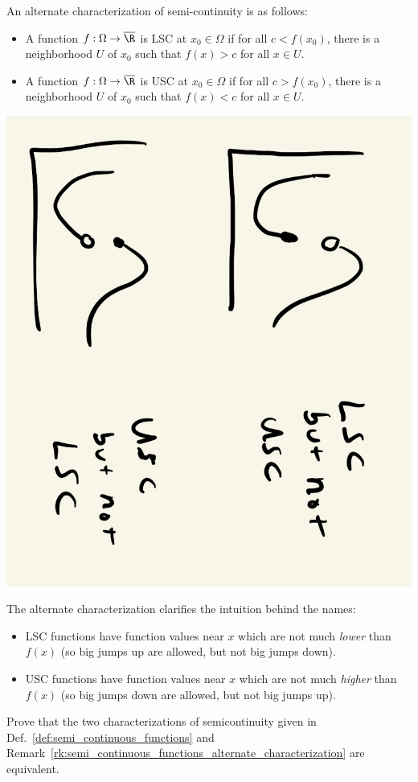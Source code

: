 \documentclass{article} %
\begin{document}
\begin{remark}

An alternate characterization of semi-continuity is as follows:

\begin{itemize}
\item  A function $f: \Omega \to \overline{\R}$ is LSC at $x_0 \in \Omega$ if for all $c < f(x_0)$, there is a neighborhood $U$ of $x_0$ such that $f(x) > c$ for all $x \in U$. 
\item  A function $f: \Omega \to \overline{\R}$ is USC at $x_0 \in \Omega$ if for all $c > f(x_0)$, there is a neighborhood $U$ of $x_0$ such that $f(x) < c$ for all $x \in U$. 
\end{itemize}

\begin{center}
\includegraphics[angle=90, width=.4\linewidth]{images/lsc_and_usc_function_examples}	
\end{center}

The alternate characterization clarifies the intuition behind the names:
\begin{itemize}
\item  LSC functions have function values near $x$ which are not much \textit{lower} than $f(x)$ (so big jumps up are allowed, but not big jumps down).
\item  USC functions have function values near $x$ which are not much \textit{higher} than $f(x)$ (so big jumps down are allowed, but not big jumps up).
\end{itemize}
\label{rk:semi_continuous_functions_alternate_characterization}
\end{remark} 


\begin{exercise}
Prove that the two characterizations of semicontinuity given in Def.~\ref{def:semi_continuous_functions} and Remark~\ref{rk:semi_continuous_functions_alternate_characterization} are equivalent.
\end{exercise}
\end{document}
